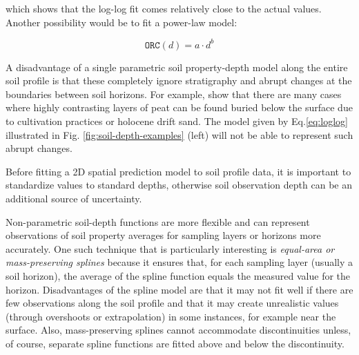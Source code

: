 \documentclass[graybox,natbib,nospthms,UStrade]{svmono}
\let\BeginKnitrBlock\begin \let\EndKnitrBlock\end
\let\BeginKnitrBlock\begin \let\EndKnitrBlock\end
\begin{document}
which shows that the log-log fit comes relatively close to the actual values.
Another possibility would be to fit a power-law model:

\begin{equation}
{\texttt{ORC}} (d) = a \cdot d^b
\label{eq:loglog}
\end{equation}

A disadvantage of a single parametric soil property-depth model along
the entire soil profile is that these completely ignore stratigraphy and
abrupt changes at the boundaries between soil horizons. For example,
\citet{Kempen2011Geoderma} show that there are many cases where highly
contrasting layers of peat can be found buried below the surface due to
cultivation practices or holocene drift sand. The model given by
Eq.\eqref{eq:loglog} illustrated in Fig. \ref{fig:soil-depth-examples}
(left) will not be able to represent such abrupt changes.

\BeginKnitrBlock{rmdnote}
Before fitting a 2D spatial prediction model to soil profile data, it is
important to standardize values to standard depths, otherwise soil
observation depth can be an additional source of uncertainty.
\EndKnitrBlock{rmdnote}

Non-parametric soil-depth functions are more flexible and can represent
observations of soil property averages for sampling layers or horizons
more accurately. One such technique that is particularly interesting is
\emph{equal-area or mass-preserving splines}
\citep{Bishop1999Geoderma, Malone2009Geoderma} because it ensures that, for
each sampling layer (usually a soil horizon), the average of the spline
function equals the measured value for the horizon. Disadvantages of the
spline model are that it may not fit well if there are few observations
along the soil profile and that it may create unrealistic values
(through overshoots or extrapolation) in some instances, for example
near the surface. Also, mass-preserving splines cannot accommodate
discontinuities unless, of course, separate spline functions are fitted
above and below the discontinuity.
\end{document}
